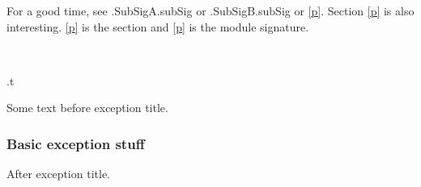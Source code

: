 For a good time, see .SubSigA.subSig or .SubSigB.subSig or \hyperref[container-page-test-module-Ocamlary-module-type-SuperSig-module-type-EmptySig]{[p\pageref*{container-page-test-module-Ocamlary-module-type-SuperSig-module-type-EmptySig}]}. Section \hyperref[container-page-test-module-Ocamlary-s9000]{[p\pageref*{container-page-test-module-Ocamlary-s9000}]} is also interesting. \hyperref[container-page-test-module-Ocamlary-emptySig]{[p\pageref*{container-page-test-module-Ocamlary-emptySig}]} is the section and \hyperref[container-page-test-module-Ocamlary-module-type-EmptySig]{[p\pageref*{container-page-test-module-Ocamlary-module-type-EmptySig}]} is the module signature.

\label{container-page-test-module-Ocamlary-module-Buffer}\begin{ocamlindent}\label{container-page-test-module-Ocamlary-module-Buffer-val-f}\\
\end{ocamlindent}%
\begin{ocamlindent}.t\end{ocamlindent}%
\medbreak
Some text before exception title.

\subsubsection{Basic exception stuff\label{basic-exception-stuff}}%
After exception title.

